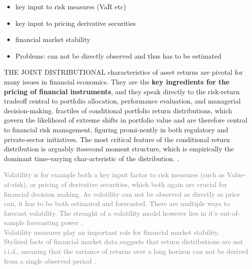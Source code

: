 \begin{itemize}\itemsep0pt
\item key input to risk measures (VaR etc)
\item key input to pricing derivative securities
\item financial market stability
\item Problems: can not be directly observed and thus has to be estimated  
\end{itemize}

THE JOINT DISTRIBUTIONAL characteristics of asset returns are pivotal for many
issues in financial economics. They are the \textbf{key ingredients for the pricing of
financial instruments}, and they speak directly to the risk-return tradeoff central
to portfolio allocation, performance evaluation, and managerial decision-making. 
fractiles of conditional portfolio
return distributions, which govern the likelihood of extreme shifts in portfolio
value and are therefore central to financial risk management, figuring promi-nently in both regulatory and private-sector initiatives. The most critical feature of the conditional return distribution is arguably itssecond moment structure, which is empirically the dominant time-varying char-acteristic of the distribution. \parencite{andersen2018}.


\textcolor{gray}{
Volatility is for example both a key input factor to risk measures (such as Value-at-risk), or pricing of derivative securities, which both again are crucial for financial decision making. As volatility can not be observed as directly as price can, it has to be both estimated and forecasted. There are multiple ways to forecast volatility. The strenght of a volatility model however lies in it's out-of-sample forecasting power \parencite{poon2003}. \\
Volatility measures play an important role for financial market stability.\\
Stylized facts of financial market data suggests that return distributions are not i.i.d., meaning that the variance of returns over a long horizon can not be derived from a single observed period \parencite{poon2003}. }


